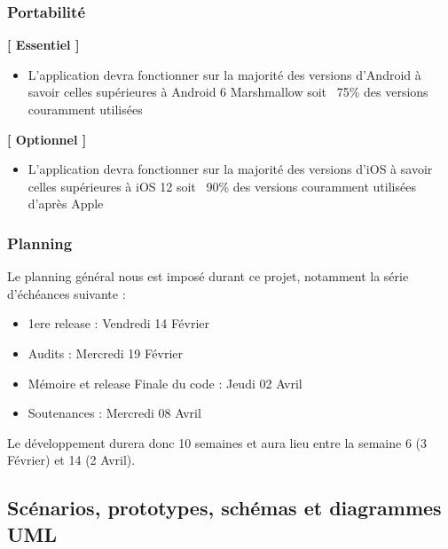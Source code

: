 \documentclass{article}
\begin{document}
		\subsubsection{Portabilité}
		\textbf{[ Essentiel ]}
		\begin{itemize}
			\item L'application devra fonctionner sur la majorité des versions d'Android à savoir celles supérieures à Android 6 Marshmallow soit ~75\% des versions couramment utilisées \cite{AndroidVersion2019}
		\end{itemize}
		\textbf{[ Optionnel ]}
		\begin{itemize}
			\item L'application devra fonctionner sur la majorité des versions d'iOS à savoir celles supérieures à iOS 12 soit ~90\% des versions couramment utilisées d'après Apple  \cite{iOSVersion2019}
		\end{itemize}
		\subsubsection{Planning}
						
		Le planning général nous est imposé durant ce projet, notamment la série d'échéances suivante : 
		\begin{itemize}
			\item	   1ere release : Vendredi 14 Février
			\item	  Audits : Mercredi 19 Février
			\item	   Mémoire et release Finale du code : Jeudi 02 Avril
			\item	  Soutenances : Mercredi 08 Avril
		\end{itemize}
		Le développement durera donc 10 semaines et aura lieu entre la semaine 6 (3 Février) et 14 (2 Avril).
						            
						
								   
		\subsection{Scénarios, prototypes, schémas et diagrammes UML}
\end{document}
